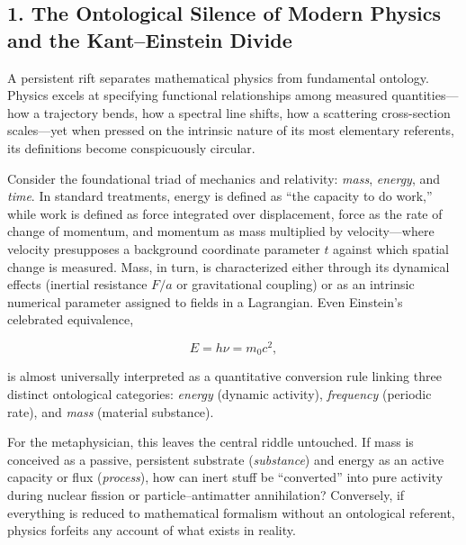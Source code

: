 \documentclass[
]{article}
\begin{document}
\subsection{1. The Ontological Silence of Modern Physics and the
Kant--Einstein
Divide}\label{the-ontological-silence-of-modern-physics-and-the-kanteinstein-divide}

A persistent rift separates mathematical physics from fundamental
ontology. Physics excels at specifying functional relationships among
measured quantities---how a trajectory bends, how a spectral line
shifts, how a scattering cross-section scales---yet when pressed on the
intrinsic nature of its most elementary referents, its definitions
become conspicuously circular.

Consider the foundational triad of mechanics and relativity:
\emph{mass}, \emph{energy}, and \emph{time}. In standard treatments,
energy is defined as ``the capacity to do work,'' while work is defined
as force integrated over displacement, force as the rate of change of
momentum, and momentum as mass multiplied by velocity---where velocity
presupposes a background coordinate parameter \(t\) against which
spatial change is measured. Mass, in turn, is characterized either
through its dynamical effects (inertial resistance \(F/a\) or
gravitational coupling) or as an intrinsic numerical parameter assigned
to fields in a Lagrangian. Even Einstein's celebrated equivalence,

\[E = h\nu = m_0 c^2,\]

is almost universally interpreted as a quantitative conversion rule
linking three distinct ontological categories: \emph{energy} (dynamic
activity), \emph{frequency} (periodic rate), and \emph{mass} (material
substance).

For the metaphysician, this leaves the central riddle untouched. If mass
is conceived as a passive, persistent substrate (\emph{substance}) and
energy as an active capacity or flux (\emph{process}), how can inert
stuff be ``converted'' into pure activity during nuclear fission or
particle--antimatter annihilation? Conversely, if everything is reduced
to mathematical formalism without an ontological referent, physics
forfeits any account of what exists in reality.
\end{document}
